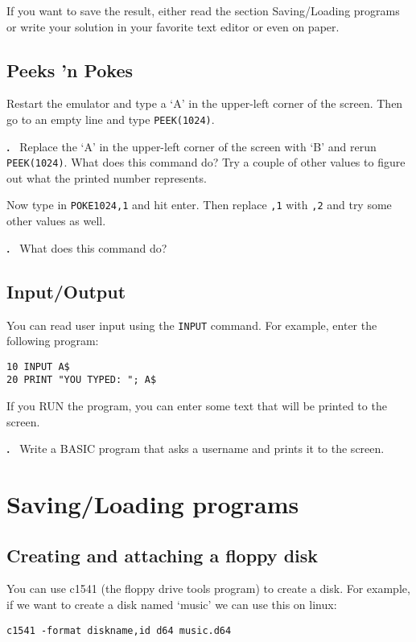 \documentclass{article}
\newcounter{problem}
\newcounter{solution}
\newcommand\problem{%
  \stepcounter{problem}%
  \textbf{\theproblem.}~%
  \setcounter{solution}{0}%
}
\begin{document}
If you want to save the result, either read the section Saving/Loading programs or write your solution in your favorite text editor or even on paper.

\subsection{Peeks 'n Pokes}

Restart the emulator and type a `A' in the upper-left corner of the screen.
Then go to an empty line and type \verb:PEEK(1024):.

\problem Replace the `A' in the upper-left corner of the screen with `B' and rerun \verb:PEEK(1024):.
What does this command do? Try a couple of other values to figure out what the printed number represents.

Now type in \verb:POKE1024,1: and hit enter. Then replace \verb:,1: with \verb:,2: and try some other values as well.

\problem What does this command do?

\subsection{Input/Output}

You can read user input using the \verb:INPUT: command.
For example, enter the following program:

\begin{lstlisting}
10 INPUT A$
20 PRINT "YOU TYPED: "; A$
\end{lstlisting}

If you RUN the program, you can enter some text that will be printed to the screen.

\problem Write a BASIC program that asks a username and prints it to the screen.

\section{Saving/Loading programs}

\subsection{Creating and attaching a floppy disk}

You can use c1541 (the floppy drive tools program) to create a disk.
For example, if we want to create a disk named `music' we can use this on linux:

\begin{lstlisting}
c1541 -format diskname,id d64 music.d64
\end{lstlisting}
\end{document}
